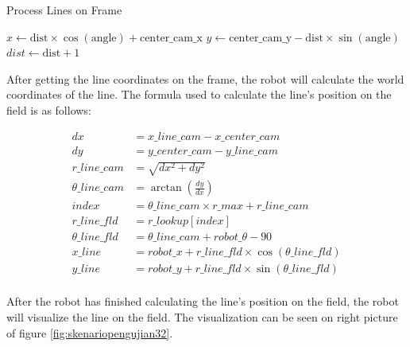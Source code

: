 \begin{algorithm}[htbp]
  \caption{Process Lines on Frame}\label{alg:process_lines}
  \begin{algorithmic}[1]
      \State {}
          \State {}
              \State $x \gets \text{dist} \times \cos(\text{angle}) + \text{center\_cam\_x}$
              \State $y \gets \text{center\_cam\_y} - \text{dist} \times \sin(\text{angle})$
                  \State {}
              \EndIf
              \State $dist \gets \text{dist} + 1$
          \EndFor
      \EndFor
  \EndProcedure
  \end{algorithmic}
\end{algorithm}

After getting the line coordinates on the frame, the robot will calculate the world coordinates of the line. The formula used to calculate the line's position on the field is as follows:

\begin{equation}
  \begin{aligned}
    dx &= x\_line\_cam - x\_center\_cam \\
    dy &= y\_center\_cam - y\_line\_cam \\
    r\_line\_cam &= \sqrt{dx^2 + dy^2} \\
    \theta\_line\_cam &= \arctan(\frac{dy}{dx}) \\
    index &= \theta\_line\_cam \times r\_max + r\_line\_cam \\ 
    r\_line\_fld &= r\_lookup[index] \\
    \theta\_line\_fld &= \theta\_line\_cam + robot\_\theta - 90 \\
    x\_line &= robot\_x + r\_line\_fld \times \cos(\theta\_line\_fld) \\
    y\_line &= robot\_y + r\_line\_fld \times \sin(\theta\_line\_fld) \\
  \end{aligned}
\end{equation}

After the robot has finished calculating the line's position on the field, the robot will visualize the line on the field. The visualization can be seen on right picture of figure \ref{fig:skenariopengujian32}.


